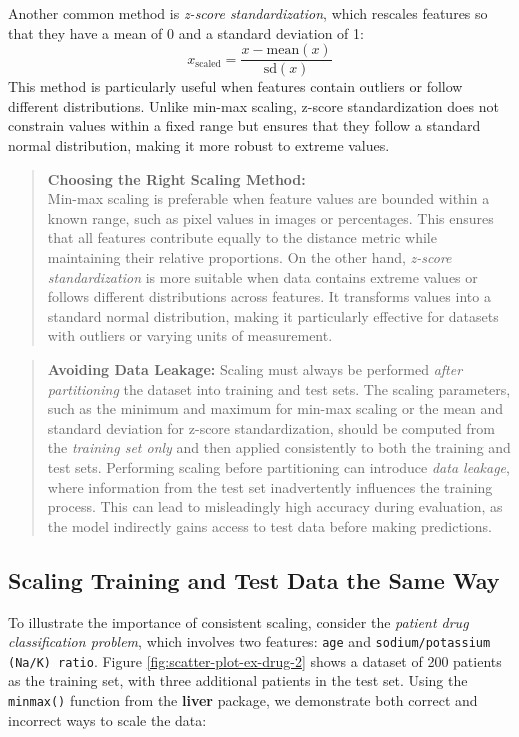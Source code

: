 \documentclass[
]{book}
\newcommand{\passthrough}[1]{#1}
\theoremstyle{definition}
\theoremstyle{definition}
\theoremstyle{definition}
\theoremstyle{definition}
\theoremstyle{remark}
\begin{document}
Another common method is \emph{z-score standardization}, which rescales features so that they have a mean of 0 and a standard deviation of 1:
\[
x_{\text{scaled}} = \frac{x - \text{mean}(x)}{\text{sd}(x)}
\]
This method is particularly useful when features contain outliers or follow different distributions. Unlike min-max scaling, z-score standardization does not constrain values within a fixed range but ensures that they follow a standard normal distribution, making it more robust to extreme values.

\begin{quote}
\textbf{Choosing the Right Scaling Method:}\\
Min-max scaling is preferable when feature values are bounded within a known range, such as pixel values in images or percentages. This ensures that all features contribute equally to the distance metric while maintaining their relative proportions. On the other hand, \emph{z-score standardization} is more suitable when data contains extreme values or follows different distributions across features. It transforms values into a standard normal distribution, making it particularly effective for datasets with outliers or varying units of measurement.
\end{quote}

\begin{quote}
\textbf{Avoiding Data Leakage:}
Scaling must always be performed \emph{after partitioning} the dataset into training and test sets. The scaling parameters, such as the minimum and maximum for min-max scaling or the mean and standard deviation for z-score standardization, should be computed from the \emph{training set only} and then applied consistently to both the training and test sets. Performing scaling before partitioning can introduce \emph{data leakage}, where information from the test set inadvertently influences the training process. This can lead to misleadingly high accuracy during evaluation, as the model indirectly gains access to test data before making predictions.
\end{quote}

\subsection{Scaling Training and Test Data the Same Way}\label{scaling-training-and-test-data-the-same-way}

To illustrate the importance of consistent scaling, consider the \emph{patient drug classification problem}, which involves two features: \passthrough{\lstinline!age!} and \passthrough{\lstinline!sodium/potassium (Na/K) ratio!}. Figure \ref{fig:scatter-plot-ex-drug-2} shows a dataset of 200 patients as the training set, with three additional patients in the test set. Using the \passthrough{\lstinline!minmax()!} function from the \textbf{liver} package, we demonstrate both correct and incorrect ways to scale the data:
\end{document}
